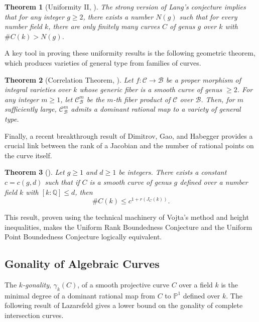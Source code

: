 \documentclass[11pt, a4paper]{amsart}
\newtheorem{thm}{Theorem}[section]
\theoremstyle{definition}
\newcommand{\Q}{\mathbb{Q}}
\newcommand{\Pp}{\mathbb{P}}
\newcommand{\Cc}{\mathcal{C}}
\begin{document}
\begin{thm}[Uniformity II, \cite{Caporaso1997}]
	\label{UGB}
	The strong version of Lang's conjecture implies that for any integer $g \geq 2$, there exists a number $N(g)$ such that for every number field $k$, there are only finitely many curves $C$ of genus $g$ over $k$ with $\#C(k) > N(g)$.
\end{thm}

A key tool in proving these uniformity results is the following geometric theorem, which produces varieties of general type from families of curves.

\begin{thm}[Correlation Theorem, \cite{Caporaso1997}]
	\label{corel}
	Let $f: \Cc \rightarrow \mathcal{B}$ be a proper morphism of integral varieties over $k$ whose generic fiber is a smooth curve of genus $\geq 2$. For any integer $m \geq 1$, let $\Cc_\mathcal{B}^m$ be the $m$-th fiber product of $\Cc$ over $\mathcal{B}$. Then, for $m$ sufficiently large, $\Cc_\mathcal{B}^m$ admits a dominant rational map to a variety of general type.
\end{thm}

Finally, a recent breakthrough result of Dimitrov, Gao, and Habegger provides a crucial link between the rank of a Jacobian and the number of rational points on the curve itself.

\begin{thm}[\cite{Dimitrov2021}]
	\label{dgh}
	Let $g \geq 1$ and $d \geq 1$ be integers. There exists a constant $c=c(g,d)$ such that if $C$ is a smooth curve of genus $g$ defined over a number field $k$ with $[k:\Q] \leq d$, then
	\[ \#C(k) \leq c^{1+r(J_C(k))}. \]
\end{thm}

This result, proven using the technical machinery of Vojta's method and height inequalities, makes the Uniform Rank Boundedness Conjecture and the Uniform Point Boundedness Conjecture logically equivalent. 

\subsection{Gonality of Algebraic Curves}
The \textit{$k$-gonality}, $\gamma_k(C)$, of a smooth projective curve $C$ over a field $k$ is the minimal degree of a dominant rational map from $C$ to $\Pp^1$ defined over $k$. The following result of Lazarsfeld gives a lower bound on the gonality of complete intersection curves.
\end{document}

